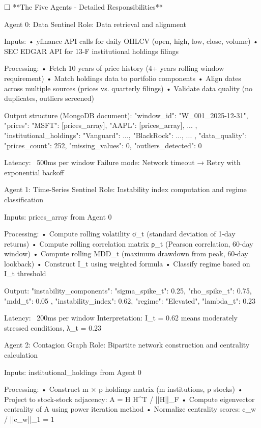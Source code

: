 ❑ **The Five Agents - Detailed Responsibilities**

Agent 0: Data Sentinel
   Role: Data retrieval and alignment
   
   Inputs:
   • yfinance API calls for daily OHLCV (open, high, low, close, volume)
   • SEC EDGAR API for 13-F institutional holdings filings
   
   Processing:
   • Fetch 10 years of price history (4+ years rolling window requirement)
   • Match holdings data to portfolio components
   • Align dates across multiple sources (prices vs. quarterly filings)
   • Validate data quality (no duplicates, outliers screened)
   
   Output structure (MongoDB document):
   {
     "window_id": "W_001_2025-12-31",
     "prices": {
       "MSFT": [prices_array],
       "AAPL": [prices_array],
       ...
     },
     "institutional_holdings": {
       "Vanguard": {...},
       "BlackRock": {...},
       ...
     },
     "data_quality": {
       "prices_count": 252,
       "missing_values": 0,
       "outliers_detected": 0
     }
   }
   
   Latency: ~500ms per window
   Failure mode: Network timeout → Retry with exponential backoff

Agent 1: Time-Series Sentinel
   Role: Instability index computation and regime classification
   
   Inputs: prices_array from Agent 0
   
   Processing:
   • Compute rolling volatility σ_t (standard deviation of 1-day returns)
   • Compute rolling correlation matrix ρ_t (Pearson correlation, 60-day window)
   • Compute rolling MDD_t (maximum drawdown from peak, 60-day lookback)
   • Construct I_t using weighted formula
   • Classify regime based on I_t threshold
   
   Output:
   {
     "instability_components": {
       "sigma_spike_t": 0.25,
       "rho_spike_t": 0.75,
       "mdd_t": 0.05
     },
     "instability_index": 0.62,
     "regime": "Elevated",
     "lambda_t": 0.23
   }
   
   Latency: ~200ms per window
   Interpretation: I_t = 0.62 means moderately stressed conditions, λ_t = 0.23

Agent 2: Contagion Graph
   Role: Bipartite network construction and centrality calculation
   
   Inputs: institutional_holdings from Agent 0
   
   Processing:
   • Construct m × p holdings matrix (m institutions, p stocks)
   • Project to stock-stock adjacency: A = H H^T / ||H||_F
   • Compute eigenvector centrality of A using power iteration method
   • Normalize centrality scores: c_w / ||c_w||_1 = 1
   
